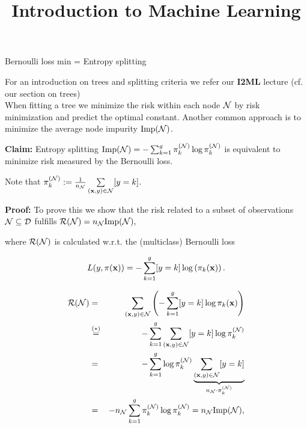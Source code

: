 \documentclass[11pt,compress,t,notes=noshow, xcolor=table]{beamer}
\title{Introduction to Machine Learning}
\begin{document}
    

\begin{vbframe}{Bernoulli loss min = Entropy splitting}

For an introduction on trees and splitting criteria we refer our \textbf{I2ML} lecture (cf. our section on trees)\\
\vspace{0.2cm}
When fitting a tree we minimize the risk within each node $\mathcal{N}$ by risk minimization and predict the optimal constant. Another common approach is to minimize the average node impurity $\text{Imp}(\mathcal{N})$. 

\vspace*{0.2cm}

\textbf{Claim:} Entropy splitting $\text{Imp}(\mathcal{N}) = -\textstyle\sum_{k = 1}^g \pi_k^{(\mathcal{N})} \log \pi_k^{(\mathcal{N})}$ is equivalent to minimize risk measured by the Bernoulli loss. 

\begin{footnotesize}
Note that $\pi_k^{(\mathcal{N})} := \frac{1}{n_{\mathcal{N}}} \sum\limits_{(\mathbf{x},y) \in \mathcal{N}} [y = k]$. 
\end{footnotesize}

\vspace*{0.2cm}

\textbf{Proof: } To prove this we show that the risk related to a subset of observations $\mathcal{N} \subseteq \mathcal{D}$ fulfills $\mathcal{R}(\mathcal{N}) = n_{\mathcal{N}} \text{Imp}(\mathcal{N}),
$
  
where 
$\mathcal{R}(\mathcal{N})$ is calculated w.r.t. the (multiclass) Bernoulli loss  

$$
  L(y, \pi(\mathbf{x})) = -\sum_{k = 1}^g [y = k] \log \left(\pi_k(\mathbf{x})\right).
$$

\framebreak 
\begin{footnotesize}
\begin{eqnarray*}
\mathcal{R}(\mathcal{N}) &=& \sum_{(\mathbf{x}, y) \in \mathcal{N}} \left(- \sum_{k = 1}^g [y = k] \log \pi_k(\mathbf{x}) \right) \\
&\overset{(*)}{=}& -\sum_{k = 1}^g \sum_{(\mathbf{x}, y) \in \mathcal{N}} [y = k]\log \pi_k^{(\mathcal{N})} \\
&=& -\sum_{k = 1}^g \log \pi_k^{(\mathcal{N})} \underbrace{\sum_{(\mathbf{x}, y) \in \mathcal{N}} [y = k]}_{n_{\mathcal{N}}\cdot \pi_k^{(\mathcal{N})} } \\
 &=& -n_{\mathcal{N}} \sum_{k = 1}^g \pi_k^{(\mathcal{N})} \log \pi_k^{(\mathcal{N})} = n_{\mathcal{N}} \text{Imp}(\mathcal{N}), 
\end{eqnarray*} 


\end{footnotesize}
\end{vbframe}
\end{document}
